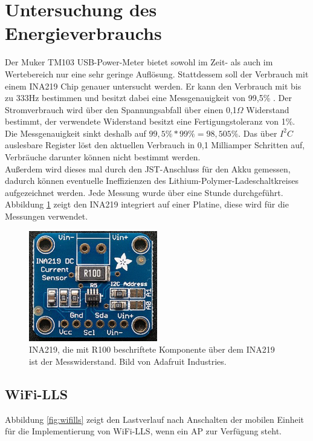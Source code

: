 \section{Untersuchung des Energieverbrauchs}
\label{ch:phase1:sec:energie}
Der Muker TM103 USB-Power-Meter bietet sowohl im Zeit- als auch im Wertebereich nur eine sehr geringe Auflösung.
Stattdessem soll der Verbrauch mit einem INA219 Chip genauer untersucht werden.
Er kann den Verbrauch mit bis zu 333Hz bestimmen und besitzt dabei eine Messgenauigkeit von 99,5\% \cite{texas2015ina}.
Der Stromverbrauch wird über den Spannungsabfall über einen 0,1$\Omega$ Widerstand bestimmt, der verwendete Widerstand besitzt eine Fertigungstoleranz von 1\%.
Die Messgenauigkeit sinkt deshalb auf $99,5\% * 99\% = 98,505\%$. 
Das über $I^2C$ auslesbare Register löst den aktuellen Verbrauch in 0,1 Milliamper Schritten auf, Verbräuche darunter können nicht bestimmt werden.\\
Außerdem wird dieses mal durch den JST-Anschluss für den Akku gemessen, dadurch können eventuelle Ineffizienzen des Lithium-Polymer-Ladeschaltkreises aufgezeichnet werden. 
Jede Messung wurde über eine Stunde durchgeführt.
Abbildung \ref{fig:ina219} zeigt den INA219 integriert auf einer Platine, diese wird für die Messungen verwendet.

\begin{figure}[h!]
  \centering
	\includegraphics[width=0.5\textwidth]{images/ina219ada.png}
  \caption{INA219, die mit R100 beschriftete Komponente über dem INA219 ist der Messwiderstand. Bild von Adafruit Industries.}
  \label{fig:ina219}
\end{figure}

\subsection{WiFi-LLS}
\label{ch:phase1:sec:powerwifills}
Abbildung \ref{fig:wifills} zeigt den Lastverlauf nach Anschalten der mobilen Einheit für die Implementierung von WiFi-LLS, wenn ein AP zur Verfügung steht. 

